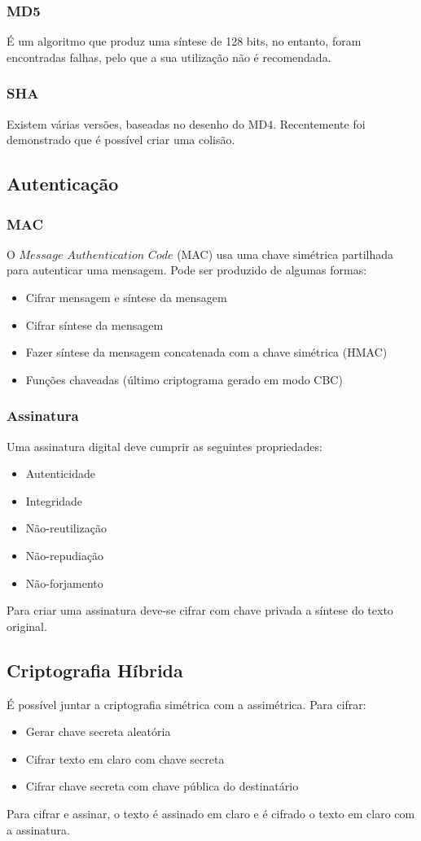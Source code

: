 \documentclass[10pt,a4paper]{report}
\begin{document}
\subsubsection{MD5}
É um algoritmo que produz uma síntese de 128 bits, no entanto, foram encontradas falhas, pelo que a sua utilização não é recomendada.
\subsubsection{SHA}
Existem várias versões, baseadas no desenho do MD4. Recentemente foi demonstrado que é possível criar uma colisão.
\subsection{Autenticação}
\subsubsection{MAC}
O $Message$ $Authentication$ $Code$ (MAC) usa uma chave simétrica partilhada para autenticar uma mensagem. Pode ser produzido de algumas formas:
\begin{itemize}
\item Cifrar mensagem e síntese da mensagem
\item Cifrar síntese da mensagem
\item Fazer síntese da mensagem concatenada com a chave simétrica (HMAC)
\item Funções chaveadas (último criptograma gerado em modo CBC)
\end{itemize}
\subsubsection{Assinatura}
Uma assinatura digital deve cumprir as seguintes propriedades:
\begin{itemize}
\item Autenticidade
\item Integridade
\item Não-reutilização
\item Não-repudiação
\item Não-forjamento
\end{itemize}
Para criar uma assinatura deve-se cifrar com chave privada a síntese do texto original.
\subsection{Criptografia Híbrida}
É possível juntar a criptografia simétrica com a assimétrica. Para cifrar:
\begin{itemize}
\item Gerar chave secreta aleatória
\item Cifrar texto em claro com chave secreta
\item Cifrar chave secreta com chave pública do destinatário
\end{itemize}
Para cifrar e assinar, o texto é assinado em claro e é cifrado o texto em claro com a assinatura.
\end{document}
